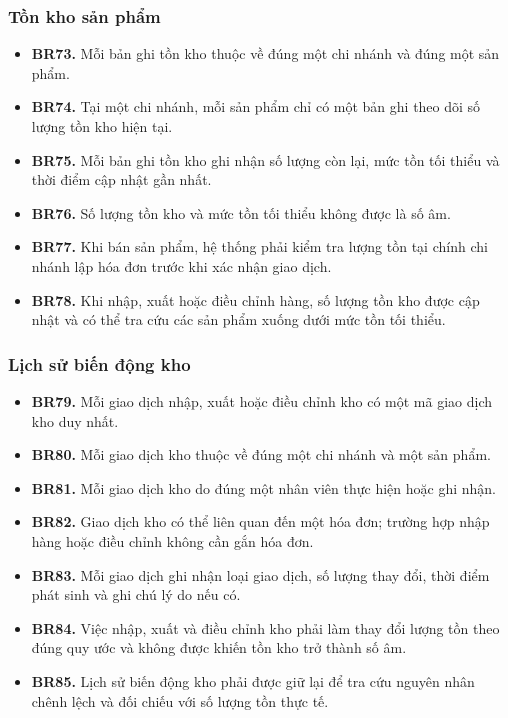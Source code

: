 \documentclass[11pt, a4paper]{article}
\begin{document}
\subsubsection{Tồn kho sản phẩm}
\begin{itemize}
    \item \textbf{BR73.} Mỗi bản ghi tồn kho thuộc về đúng một chi nhánh và đúng một sản phẩm.
    \item \textbf{BR74.} Tại một chi nhánh, mỗi sản phẩm chỉ có một bản ghi theo dõi số lượng tồn kho hiện tại.
    \item \textbf{BR75.} Mỗi bản ghi tồn kho ghi nhận số lượng còn lại, mức tồn tối thiểu và thời điểm cập nhật gần nhất.
    \item \textbf{BR76.} Số lượng tồn kho và mức tồn tối thiểu không được là số âm.
    \item \textbf{BR77.} Khi bán sản phẩm, hệ thống phải kiểm tra lượng tồn tại chính chi nhánh lập hóa đơn trước khi xác nhận giao dịch.
    \item \textbf{BR78.} Khi nhập, xuất hoặc điều chỉnh hàng, số lượng tồn kho được cập nhật và có thể tra cứu các sản phẩm xuống dưới mức tồn tối thiểu.
\end{itemize}

\subsubsection{Lịch sử biến động kho}
\begin{itemize}
    \item \textbf{BR79.} Mỗi giao dịch nhập, xuất hoặc điều chỉnh kho có một mã giao dịch kho duy nhất.
    \item \textbf{BR80.} Mỗi giao dịch kho thuộc về đúng một chi nhánh và một sản phẩm.
    \item \textbf{BR81.} Mỗi giao dịch kho do đúng một nhân viên thực hiện hoặc ghi nhận.
    \item \textbf{BR82.} Giao dịch kho có thể liên quan đến một hóa đơn; trường hợp nhập hàng hoặc điều chỉnh không cần gắn hóa đơn.
    \item \textbf{BR83.} Mỗi giao dịch ghi nhận loại giao dịch, số lượng thay đổi, thời điểm phát sinh và ghi chú lý do nếu có.
    \item \textbf{BR84.} Việc nhập, xuất và điều chỉnh kho phải làm thay đổi lượng tồn theo đúng quy ước và không được khiến tồn kho trở thành số âm.
    \item \textbf{BR85.} Lịch sử biến động kho phải được giữ lại để tra cứu nguyên nhân chênh lệch và đối chiếu với số lượng tồn thực tế.
\end{itemize}
\end{document}
